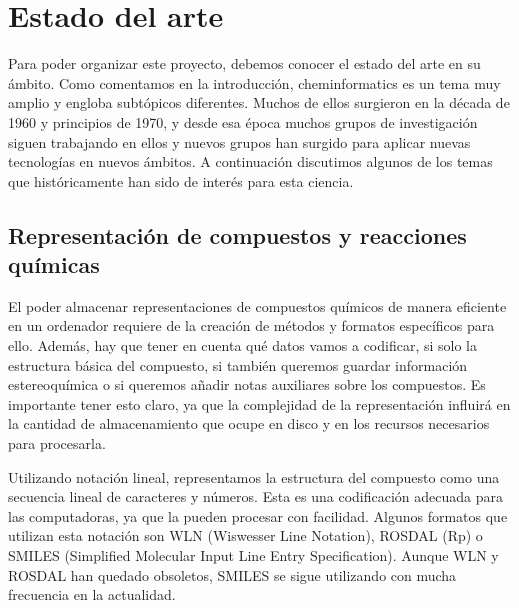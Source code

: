 \chapter*{Estado del arte}
Para poder organizar este proyecto, debemos conocer el estado del arte en su ámbito. Como comentamos en la introducción, cheminformatics es un tema muy amplio y engloba subtópicos diferentes. Muchos de ellos surgieron en la década de 1960 y principios de 1970, y desde esa época muchos grupos de investigación siguen trabajando en ellos y nuevos grupos han surgido para aplicar nuevas tecnologías en nuevos ámbitos. A continuación discutimos algunos de los temas que históricamente han sido de interés para esta ciencia. \cite{doi:10.1021/ci600234z}

\section*{Representación de compuestos y reacciones químicas}
El poder almacenar representaciones de compuestos químicos de manera eficiente en un ordenador requiere de la creación de métodos y formatos específicos para ello. Además, hay que tener en cuenta qué datos vamos a codificar, si solo la estructura básica del compuesto, si también queremos guardar información estereoquímica o si queremos añadir notas auxiliares sobre los compuestos. Es importante tener esto claro, ya que la complejidad de la representación influirá en la cantidad de almacenamiento que ocupe en disco y en los recursos necesarios para procesarla.

Utilizando notación lineal, representamos la estructura del compuesto como una secuencia lineal de caracteres y números. Esta es una codificación adecuada para las computadoras, ya que la pueden procesar con facilidad. Algunos formatos que utilizan esta notación son WLN (Wiswesser Line Notation), ROSDAL (Rp) o SMILES (Simplified Molecular Input Line Entry Specification). Aunque WLN y ROSDAL han quedado obsoletos, SMILES se sigue utilizando con mucha frecuencia en la actualidad. \cite{doi:10.1021/ci600234z}

